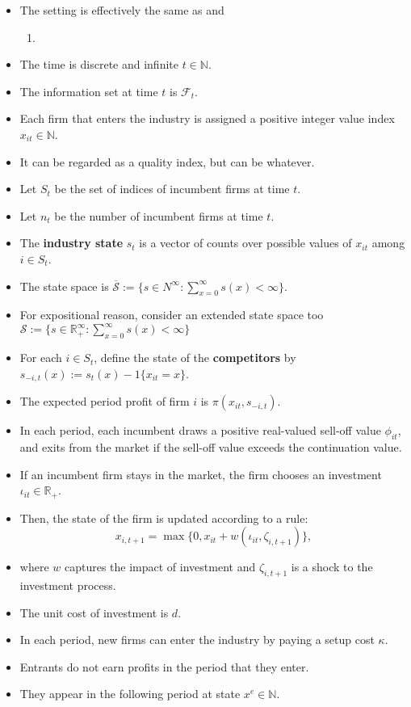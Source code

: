 \documentclass[
]{book}
\providecommand{\tightlist}{%
  \setlength{\itemsep}{0pt}\setlength{\parskip}{0pt}}
\begin{document}
\begin{itemize}
\tightlist
\item
  The setting is effectively the same as
  \citet{ericsonMarkovPerfectIndustryDynamics1995} and

  \begin{enumerate}
  \def\labelenumi{\arabic{enumi}.}
  \setcounter{enumi}{1}
  \tightlist
  \item
  \end{enumerate}
\item
  The time is discrete and infinite \(t \in \mathbb{N}\).
\item
  The information set at time \(t\) is \(\mathcal{F}_t\).
\item
  Each firm that enters the industry is assigned a positive integer
  value index \(x_{it} \in \mathbb{N}\).
\item
  It can be regarded as a quality index, but can be whatever.
\item
  Let \(S_t\) be the set of indices of incumbent firms at time \(t\).
\item
  Let \(n_t\) be the number of incumbent firms at time \(t\).
\item
  The \textbf{industry state} \(s_t\) is a vector of counts over possible
  values of \(x_{it}\) among \(i \in S_t\).
\item
  The state space is
  \(\overline{\mathcal{S}} := \{s \in N^{\infty}: \sum_{x = 0}^\infty s(x) < \infty\}\).
\item
  For expositional reason, consider an extended state space too
  \(\mathcal{S} := \{s \in \mathbb{R}_+^{\infty}: \sum_{x = 0}^\infty s(x) < \infty\}\)
\item
  For each \(i \in S_{t}\), define the state of the \textbf{competitors} by
  \(s_{-i, t}(x) := s_t(x) - 1\{x_{it} = x\}\).
\item
  The expected period profit of firm \(i\) is \(\pi(x_{it}, s_{-i, t})\).
\item
  In each period, each incumbent draws a positive real-valued sell-off
  value \(\phi_{it}\), and exits from the market if the sell-off value
  exceeds the continuation value.
\item
  If an incumbent firm stays in the market, the firm chooses an
  investment \(\iota_{it} \in \mathbb{R}_+\).
\item
  Then, the state of the firm is updated according to a rule: \[
  x_{i, t + 1} = \max\{0, x_{it} + w(\iota_{it}, \zeta_{i, t + 1})\},
  \]
\item
  where \(w\) captures the impact of investment and \(\zeta_{i, t + 1}\)
  is a shock to the investment process.
\item
  The unit cost of investment is \(d\).
\item
  In each period, new firms can enter the industry by paying a setup
  cost \(\kappa\).
\item
  Entrants do not earn profits in the period that they enter.
\item
  They appear in the following period at state \(x^e \in \mathbb{N}\).
\end{itemize}
\end{document}
